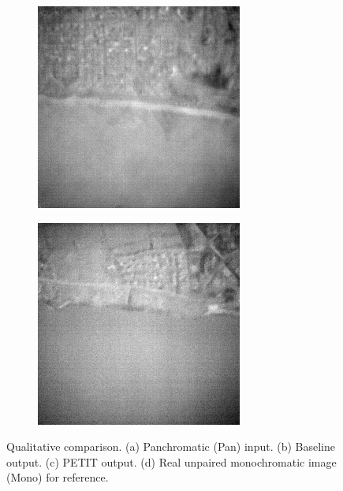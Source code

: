 \begin{figure}[H]
\begin{subfigure}[b]{0.24\textwidth}
        \label{fig:cut}
    \end{subfigure}
    \hfill
    \begin{subfigure}[b]{0.24\textwidth}
        \centering
        \includegraphics[width=\textwidth]{../figs/outputs/petit/28.png}
        \label{fig:petit}
    \end{subfigure}
    \hfill
    \begin{subfigure}[b]{0.24\textwidth}
        \centering
        \includegraphics[width=\textwidth]{../figs/outputs/mono/994.png}
        \label{fig:mono}
    \end{subfigure}

    \caption{Qualitative comparison. (a) Panchromatic (Pan) input. (b) Baseline output. (c) PETIT output. (d) Real unpaired monochromatic image (Mono) for reference.}
    \label{fig:qual_comp}
\end{figure}